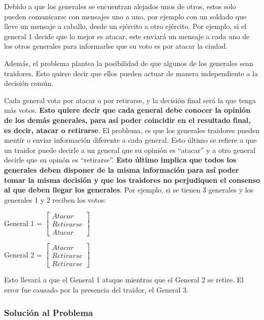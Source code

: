 Debido a que los generales se encuentran alejados unos de otros, estos solo pueden comunicarse con mensajes uno a uno, por ejemplo con un soldado que lleve un mensaje a caballo, desde un ejército a otro ejército. Por ejemplo, si el general 1 decide que lo mejor es atacar, este enviará un mensaje a cada uno de los otros generales para informarlse que su voto es por atacar la ciudad.

Además, el problema plantea la posibilidad de que algunos de los generales sean traidores. Esto quiere decir que ellos pueden actuar de manera independiente a la decisión común.

Cada general vota por atacar o por retirarse, y la decisión final será la que tenga más votos. \textbf{Esto quiere decir que cada general debe conocer la opinión de los demás generales, para así poder coincidir en el resultado final, es decir, atacar o retirarse}. El problema, es que los generales traidores pueden mentir o enviar información diferente a cada general. Esto último se refiere a que un traidor puede decirle a un general que su opinión es ``atacar'' y a otro general decirle que su opinón es ``retirarse''. \textbf{Esto último implica que todos los generales deben disponer de la misma información para así poder tomar la misma decisión y que los traidores no perjudiquen el consenso al que deben llegar los generales}. Por ejemplo, si se tienen 3 generales y los generales 1 y 2 reciben los votos:

\begin{flushleft}
    General 1 = $\begin{bmatrix}
        Atacar\\
        Retirarse\\
        Atacar
    \end{bmatrix}$
\end{flushleft}

\begin{flushleft}
    General 2 = $\begin{bmatrix}
        Atacar\\
        Retirarse\\
        Retirarse
    \end{bmatrix}$
\end{flushleft}

Esto llevará a que el General 1 ataque mientras que el General 2 se retire. El error fue causado por la presencia del traidor, el General 3.

\subsubsection*{Solución al Problema}

